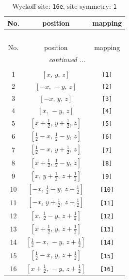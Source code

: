 \documentclass[fleqn,8pt]{jsarticle}
\begin{document}
\begin{longtable}{ccc}
\caption{Wyckoff site: {\tt 16e}, site symmetry: {\tt 1}}
 \\
 \hline \hline
No. & position & mapping \\ \hline \endfirsthead

\multicolumn{2}{l}{\tablename\ \thetable{}} \\
 \hline \hline
No. & position & mapping \\ \hline \endhead

 \hline \hline
\multicolumn{2}{r}{\footnotesize\it continued ...} \\ \endfoot

 \hline \hline
\multicolumn{2}{r}{} \\ \endlastfoot

1 & $\left[ x,\, y,\, z \right]$ & {\tt [1]} \\ \hline
2 & $\left[ - x,\, - y,\, z \right]$ & {\tt [2]} \\ \hline
3 & $\left[ - x,\, y,\, z \right]$ & {\tt [3]} \\ \hline
4 & $\left[ x,\, - y,\, z \right]$ & {\tt [4]} \\ \hline
5 & $\left[ x + \frac{1}{2},\, y + \frac{1}{2},\, z \right]$ & {\tt [5]} \\ \hline
6 & $\left[ \frac{1}{2} - x,\, \frac{1}{2} - y,\, z \right]$ & {\tt [6]} \\ \hline
7 & $\left[ \frac{1}{2} - x,\, y + \frac{1}{2},\, z \right]$ & {\tt [7]} \\ \hline
8 & $\left[ x + \frac{1}{2},\, \frac{1}{2} - y,\, z \right]$ & {\tt [8]} \\ \hline
9 & $\left[ x,\, y + \frac{1}{2},\, z + \frac{1}{2} \right]$ & {\tt [9]} \\ \hline
10 & $\left[ - x,\, \frac{1}{2} - y,\, z + \frac{1}{2} \right]$ & {\tt [10]} \\ \hline
11 & $\left[ - x,\, y + \frac{1}{2},\, z + \frac{1}{2} \right]$ & {\tt [11]} \\ \hline
12 & $\left[ x,\, \frac{1}{2} - y,\, z + \frac{1}{2} \right]$ & {\tt [12]} \\ \hline
13 & $\left[ x + \frac{1}{2},\, y,\, z + \frac{1}{2} \right]$ & {\tt [13]} \\ \hline
14 & $\left[ \frac{1}{2} - x,\, - y,\, z + \frac{1}{2} \right]$ & {\tt [14]} \\ \hline
15 & $\left[ \frac{1}{2} - x,\, y,\, z + \frac{1}{2} \right]$ & {\tt [15]} \\ \hline
16 & $\left[ x + \frac{1}{2},\, - y,\, z + \frac{1}{2} \right]$ & {\tt [16]} \\
\end{longtable}
\end{document}
